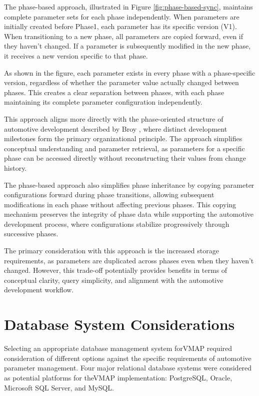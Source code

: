 The phase-based approach, illustrated in Figure \ref{fig:phase-based-sync}, maintains complete parameter sets for each phase independently. When parameters are initially created before Phase1, each parameter has its specific version (V1). When transitioning to a new phase, all parameters are copied forward, even if they haven't changed. If a parameter is subsequently modified in the new phase, it receives a new version specific to that phase.

As shown in the figure, each parameter exists in every phase with a phase-specific version, regardless of whether the parameter value actually changed between phases. This creates a clear separation between phases, with each phase maintaining its complete parameter configuration independently.

This approach aligns more directly with the phase-oriented structure of automotive development described by Broy \cite{broy2006challenges}, where distinct development milestones form the primary organizational principle. The approach simplifies conceptual understanding and parameter retrieval, as parameters for a specific phase can be accessed directly without reconstructing their values from change history.

The phase-based approach also simplifies phase inheritance by copying parameter configurations forward during phase transitions, allowing subsequent modifications in each phase without affecting previous phases. This copying mechanism preserves the integrity of phase data while supporting the automotive development process, where configurations stabilize progressively through successive phases.

The primary consideration with this approach is the increased storage requirements, as parameters are duplicated across phases even when they haven't changed. However, this trade-off potentially provides benefits in terms of conceptual clarity, query simplicity, and alignment with the automotive development workflow.

\section{Database System Considerations}
\label{sec:database-system-considerations}

Selecting an appropriate database management system for\ac{VMAP} required consideration of different options against the specific requirements of automotive parameter management. Four major relational database systems were considered as potential platforms for the\ac{VMAP} implementation: PostgreSQL, Oracle, Microsoft SQL Server, and MySQL.

